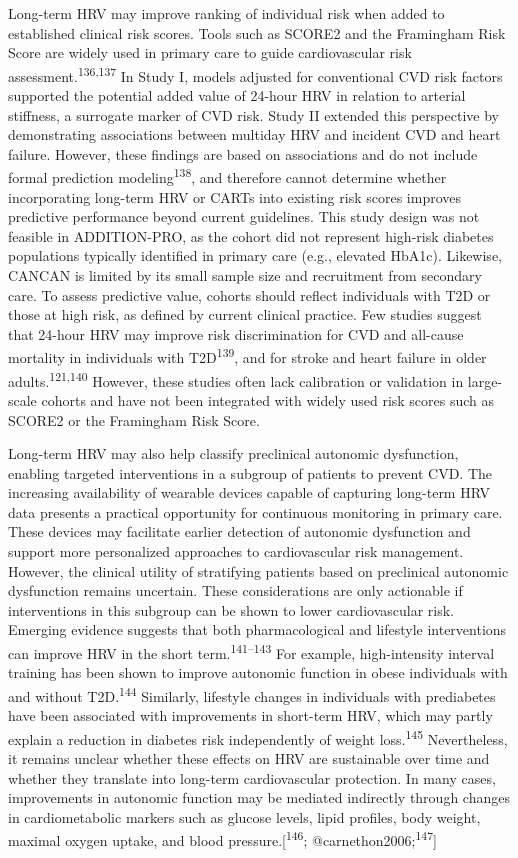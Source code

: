 \documentclass[
  letterpaper,
  headsepline=true,
  open=any]{scrbook}
\begin{document}
Long-term HRV may improve ranking of individual risk when added to
established clinical risk scores. Tools such as SCORE2 and the
Framingham Risk Score are widely used in primary care to guide
cardiovascular risk assessment.\textsuperscript{136,137} In Study I,
models adjusted for conventional CVD risk factors supported the
potential added value of 24-hour HRV in relation to arterial stiffness,
a surrogate marker of CVD risk. Study II extended this perspective by
demonstrating associations between multiday HRV and incident CVD and
heart failure. However, these findings are based on associations and do
not include formal prediction modeling\textsuperscript{138}, and
therefore cannot determine whether incorporating long-term HRV or CARTs
into existing risk scores improves predictive performance beyond current
guidelines. This study design was not feasible in ADDITION-PRO, as the
cohort did not represent high-risk diabetes populations typically
identified in primary care (e.g., elevated HbA1c). Likewise, CANCAN is
limited by its small sample size and recruitment from secondary care. To
assess predictive value, cohorts should reflect individuals with T2D or
those at high risk, as defined by current clinical practice. Few studies
suggest that 24-hour HRV may improve risk discrimination for CVD and
all-cause mortality in individuals with T2D\textsuperscript{139}, and
for stroke and heart failure in older adults.\textsuperscript{121,140}
However, these studies often lack calibration or validation in
large-scale cohorts and have not been integrated with widely used risk
scores such as SCORE2 or the Framingham Risk Score.

Long-term HRV may also help classify preclinical autonomic dysfunction,
enabling targeted interventions in a subgroup of patients to prevent
CVD. The increasing availability of wearable devices capable of
capturing long-term HRV data presents a practical opportunity for
continuous monitoring in primary care. These devices may facilitate
earlier detection of autonomic dysfunction and support more personalized
approaches to cardiovascular risk management. However, the clinical
utility of stratifying patients based on preclinical autonomic
dysfunction remains uncertain. These considerations are only actionable
if interventions in this subgroup can be shown to lower cardiovascular
risk. Emerging evidence suggests that both pharmacological and lifestyle
interventions can improve HRV in the short
term.\textsuperscript{141--143} For example, high-intensity interval
training has been shown to improve autonomic function in obese
individuals with and without T2D.\textsuperscript{144} Similarly,
lifestyle changes in individuals with prediabetes have been associated
with improvements in short-term HRV, which may partly explain a
reduction in diabetes risk independently of weight
loss.\textsuperscript{145} Nevertheless, it remains unclear whether
these effects on HRV are sustainable over time and whether they
translate into long-term cardiovascular protection. In many cases,
improvements in autonomic function may be mediated indirectly through
changes in cardiometabolic markers such as glucose levels, lipid
profiles, body weight, maximal oxygen uptake, and blood
pressure.{[}\textsuperscript{146};
@carnethon2006;\textsuperscript{147}{]}
\end{document}
